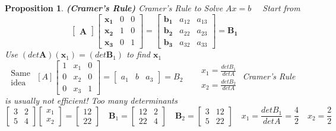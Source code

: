\documentclass[13pt]{article}
\newtheorem{proposition}[theorem]{Proposition}
\theoremstyle{definition}
\theoremstyle{remark}
\begin{document}
\begin{proposition}
    \textbf{(Cramer's Rule)} Cramer's Rule to Solve $A x=b \quad$ Start from
$$
\left[\begin{array}{ll}
\boldsymbol{A}
\end{array}\right]\left[\begin{array}{lll}
\boldsymbol{x}_{\mathbf{1}} & 0 & 0 \\
\boldsymbol{x}_{\mathbf{2}} & 1 & 0 \\
\boldsymbol{x}_{\mathbf{3}} & 0 & 1
\end{array}\right]=\left[\begin{array}{lll}
\boldsymbol{b}_{\mathbf{1}} & a_{12} & a_{13} \\
\boldsymbol{b}_{\mathbf{2}} & a_{22} & a_{23} \\
\boldsymbol{b}_{\mathbf{3}} & a_{32} & a_{33}
\end{array}\right]=\boldsymbol{B}_{\mathbf{1}}
$$
Use $(det \boldsymbol{A})\left(\boldsymbol{x}_1\right)=\left(det \boldsymbol{B}_1\right)$ to find $\boldsymbol{x}_1$
$\begin{array}{ll}\text { Same } \\ \text { idea }\end{array}[A]\left[\begin{array}{lll}1 & x_1 & 0 \\ 0 & x_2 & 0 \\ 0 & x_3 & 1\end{array}\right]=\left[\begin{array}{lll}a_1 & b & a_3\end{array}\right]=B_2 \quad \begin{aligned} & x_1=\frac{det B_1}{det A} \\ & x_2=\frac{det B_2}{det A}\end{aligned}$
Cramer's Rule is usually not efficient! Too many determinants
$$
\left[\begin{array}{ll}
3 & 2 \\
5 & 4
\end{array}\right]\left[\begin{array}{l}
x_1 \\
x_2
\end{array}\right]=\left[\begin{array}{l}
12 \\
22
\end{array}\right] \quad \boldsymbol{B}_1=\left[\begin{array}{ll}
12 & 2 \\
22 & 4
\end{array}\right] \quad \boldsymbol{B}_2=\left[\begin{array}{ll}
3 & 12 \\
5 & 22
\end{array}\right] \quad x_1=\frac{det B_1}{det A}=\frac{4}{2} \quad x_2=\frac{2}{2}
$$
\end{proposition}
\end{document}
